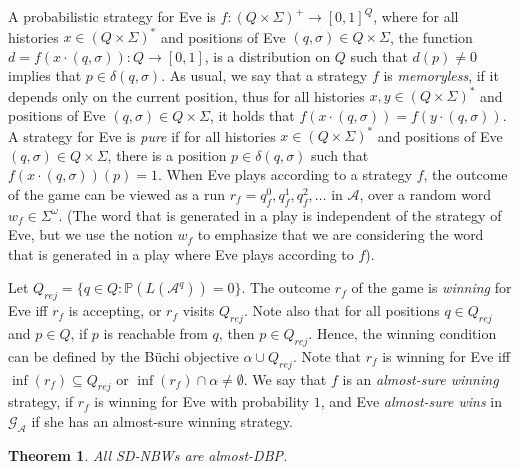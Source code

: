 \documentclass[10pt,a4paper]{amsart}
\newtheorem{thm}{Theorem}[section]
\theoremstyle{definition}
\numberwithin{equation}{section}
\newcommand{\buchi}{B\"uchi\xspace}
\newcommand{\A}{{\mathcal A}}
\newcommand{\G}{{\mathcal G}}
\renewcommand{\P}{\mathbb{P}}
\begin{document}
\noindent %
A probabilistic strategy for Eve is $f:(Q\times\Sigma)^+\rightarrow [0,1]^Q$, where for all histories $x\in (Q\times\Sigma)^*$ and positions of Eve $(q,\sigma)\in Q\times \Sigma$, the function $d=f(x\cdot (q,\sigma)):Q\rightarrow[0,1]$, is a distribution on $Q$ such that $d(p)\neq 0$ implies that $p\in \delta(q,\sigma)$. As usual, we say that a strategy $f$ is {\em memoryless\/}, if it depends only on the current position, thus for all histories $x,y\in (Q\times \Sigma)^*$ and positions of Eve $(q,\sigma)\in Q\times \Sigma$, it holds that $f(x\cdot (q,\sigma))=f(y\cdot (q,\sigma))$. A strategy for Eve is {\em pure\/} if for all histories $x\in (Q\times \Sigma)^*$ and positions of Eve $(q,\sigma)\in Q\times \Sigma$, there is a position $p\in \delta(q,\sigma)$ such that $f(x\cdot(q,\sigma))(p)=1$. When Eve plays according to a strategy $f$, the outcome of the game can be viewed as a run $r_f=q_f^0,q_f^1,q_f^2,\ldots$ in $\A$, over a random word $w_f\in \Sigma^\omega$. (The word that is generated in a play is independent of the strategy of Eve, but we use the notion $w_f$ to emphasize that we are considering the word that is generated in a play where Eve plays according to $f$). 

Let $Q_{rej}=\{q\in Q : \P(L(\A^q))=0\}$.
The outcome $r_f$ of the game is {\em winning\/} for Eve iff $r_f$ is accepting, or $r_f$ visits $Q_{rej}$. Note also that for all positions $q\in Q_{rej}$ and $p\in Q$, if $p$ is reachable from $q$, then $p\in Q_{rej}$. Hence, the winning condition can be defined by the \buchi objective $\alpha\cup Q_{rej}$. Note that $r_f$ is winning for Eve iff $\inf(r_f)\subseteq Q_{rej}$ or $\inf(r_f)\cap \alpha \neq \emptyset$. 
We say that $f$ is an {\em almost-sure winning\/} strategy, if $r_f$ is winning for Eve with probability $1$, and Eve {\em almost-sure wins} in $\G_\A$ if she has an almost-sure winning strategy.


\begin{thm}
\label{sd-nbw almost}
All SD-NBWs are almost-DBP.
\end{thm}
\end{document}
